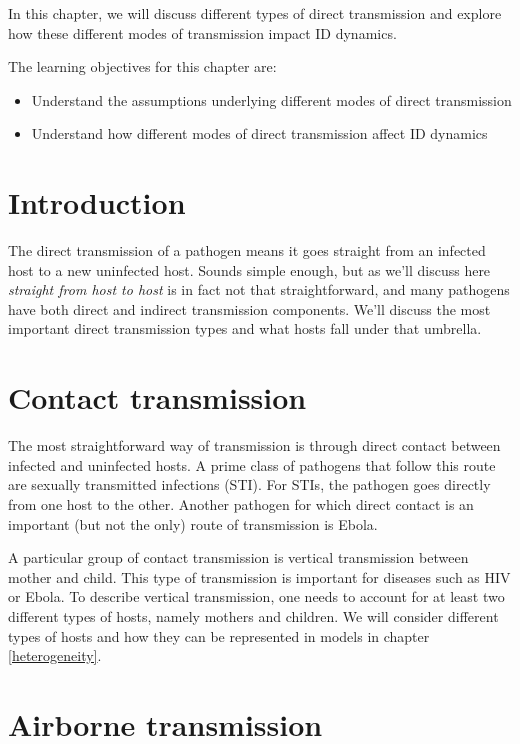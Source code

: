 \documentclass[
]{book}
\providecommand{\tightlist}{%
  \setlength{\itemsep}{0pt}\setlength{\parskip}{0pt}}
\begin{document}
In this chapter, we will discuss different types of direct transmission and explore how these different modes of transmission impact ID dynamics.

The learning objectives for this chapter are:

\begin{itemize}
\tightlist
\item
  Understand the assumptions underlying different modes of direct transmission
\item
  Understand how different modes of direct transmission affect ID dynamics
\end{itemize}

\hypertarget{introduction-5}{%
\section{Introduction}\label{introduction-5}}

The direct transmission of a pathogen means it goes straight from an infected host to a new uninfected host. Sounds simple enough, but as we'll discuss here \emph{straight from host to host} is in fact not that straightforward, and many pathogens have both direct and indirect transmission components. We'll discuss the most important direct transmission types and what hosts fall under that umbrella.

\hypertarget{contact-transmission}{%
\section{Contact transmission}\label{contact-transmission}}

The most straightforward way of transmission is through direct contact between infected and uninfected hosts. A prime class of pathogens that follow this route are sexually transmitted infections (STI). For STIs, the pathogen goes directly from one host to the other. Another pathogen for which direct contact is an important (but not the only) route of transmission is Ebola.

A particular group of contact transmission is vertical transmission between mother and child. This type of transmission is important for diseases such as HIV or Ebola. To describe vertical transmission, one needs to account for at least two different types of hosts, namely mothers and children. We will consider different types of hosts and how they can be represented in models in chapter \ref{heterogeneity}.

\hypertarget{airborne-transmission}{%
\section{Airborne transmission}\label{airborne-transmission}}
\end{document}
